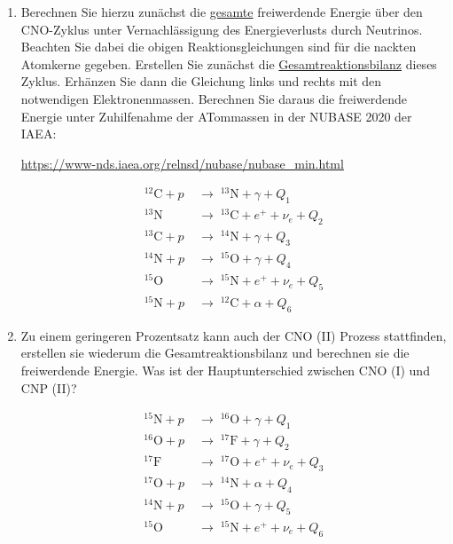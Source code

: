 \documentclass[11pt,a4paper]{scrartcl}
\begin{document}
        \begin{enumerate}
            \item 
                Berechnen Sie hierzu zunächst die \underline{gesamte} freiwerdende Energie über den CNO-Zyklus unter Vernachlässigung des Energieverlusts durch Neutrinos. Beachten Sie dabei die obigen Reaktionsgleichungen sind für die nackten Atomkerne gegeben. Erstellen Sie zunächst die \underline{Gesamtreaktionsbilanz} dieses Zyklus. Erhänzen Sie dann die Gleichung links und rechts mit den notwendigen Elektronenmassen. Berechnen Sie daraus die freiwerdende Energie unter Zuhilfenahme der ATommassen in der NUBASE 2020 der IAEA:
                
                \url{https://www-nds.iaea.org/relnsd/nubase/nubase_min.html}

                \begin{align*}
                    {}^{12}\mathrm{C} + p &\;\to\; {}^{13}\mathrm{N} + \gamma + Q_1 \\
                    {}^{13}\mathrm{N} &\;\to\; {}^{13}\mathrm{C} + e^{+} + \nu_e + Q_2 \\
                    {}^{13}\mathrm{C} + p &\;\to\; {}^{14}\mathrm{N} + \gamma + Q_3 \\
                    {}^{14}\mathrm{N} + p &\;\to\; {}^{15}\mathrm{O} + \gamma + Q_4 \\
                    {}^{15}\mathrm{O} &\;\to\; {}^{15}\mathrm{N} + e^{+} + \nu_e + Q_5 \\
                    {}^{15}\mathrm{N} + p &\;\to\; {}^{12}\mathrm{C} + \alpha + Q_6
                \end{align*}

            \item 
                Zu einem geringeren Prozentsatz kann auch der CNO (II) Prozess stattfinden, erstellen sie wiederum die Gesamtreaktionsbilanz und berechnen sie die freiwerdende Energie. Was ist der Hauptunterschied zwischen CNO (I) und CNP (II)?

                \begin{align*}
                    {}^{15}\mathrm{N} + p &\;\to\; {}^{16}\mathrm{O} + \gamma + Q_1 \\
                    {}^{16}\mathrm{O} + p &\;\to\; {}^{17}\mathrm{F} + \gamma + Q_2 \\
                    {}^{17}\mathrm{F} &\;\to\; {}^{17}\mathrm{O} + e^{+} + \nu_e + Q_3 \\
                    {}^{17}\mathrm{O} + p &\;\to\; {}^{14}\mathrm{N} + \alpha + Q_4 \\
                    {}^{14}\mathrm{N} + p &\;\to\; {}^{15}\mathrm{O} + \gamma + Q_5 \\
                    {}^{15}\mathrm{O} &\;\to\; {}^{15}\mathrm{N} + e^{+} + \nu_e + Q_6
                \end{align*}


\end{enumerate}
\end{document}
